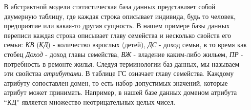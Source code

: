 В абстрактной модели статистическая база данных представляет собой двумерную таблицу, где каждая строка описывает индивида, будь то человек, предприятие или какая-то другая сущность. В нашем примере базы данных переписи каждая строка описывает главу семейства и несколько свойств его семьи: \textit{КВ} (\textit{КД}) - количество взрослых (детей), \textit{ДС} - доход семьи, в то время как стобец \textit{Доход} - доход главы семейства, \textit{ВЖ} - владение каким-либо жильем, \textit{ПР} - потребность в ремонте жилья. Следуя терминологии баз данных, мы называем эти свойства \textit{атрибутами}. В таблице ГС означает главу семейства. Каждому атрибуту сопоставлен домен, то есть набор допустимых значений, которые атрибут может принимать. Например, в нашей базе данных доменом атрибута \enquote{КД} является множество неотрицательных целых чисел.
\\

